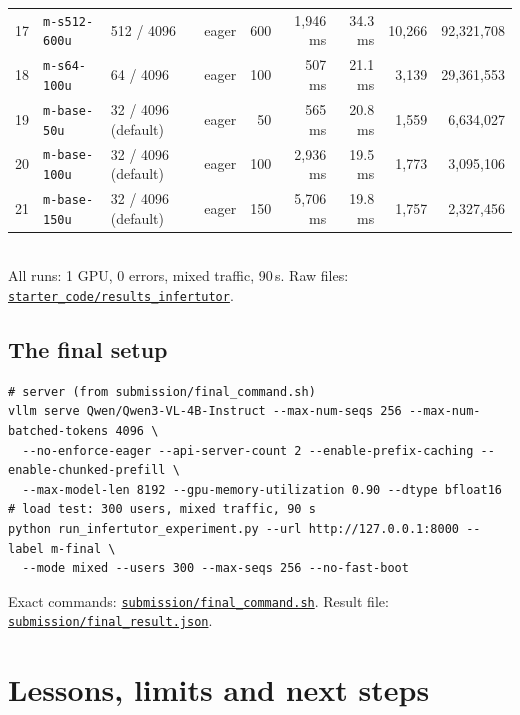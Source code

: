 \documentclass[10pt,a4paper]{article}
\newcommand{\repo}{https://github.com/himanshu1573/qwen-vl-inference-arena}
\newcommand{\file}[1]{\href{\repo/blob/main/#1}{\nolinkurl{#1}}}
\begin{document}
\begin{center}
\begin{tabular}{@{}rlllrrrrr@{}}
17 & \texttt{m-s512-600u} & 512 / 4096 & eager & 600 & 1,946 ms & 34.3 ms & 10,266 & 92,321,708 \\
18 & \texttt{m-s64-100u} & 64 / 4096 & eager & 100 & 507 ms & 21.1 ms & 3,139 & 29,361,553 \\
19 & \texttt{m-base-50u} & 32 / 4096 (default) & eager & 50 & 565 ms & 20.8 ms & 1,559 & 6,634,027 \\
20 & \texttt{m-base-100u} & 32 / 4096 (default) & eager & 100 & 2,936 ms & 19.5 ms & 1,773 & 3,095,106 \\
21 & \texttt{m-base-150u} & 32 / 4096 (default) & eager & 150 & 5,706 ms & 19.8 ms & 1,757 & 2,327,456 \\
\bottomrule
\end{tabular}\\[2pt]
{\color{ink2}All runs: 1 GPU, 0 errors, mixed traffic, 90\,s. Raw files: \file{starter_code/results_infertutor}.}
\end{center}

\subsection{The final setup}
\begin{lstlisting}
# server (from submission/final_command.sh)
vllm serve Qwen/Qwen3-VL-4B-Instruct --max-num-seqs 256 --max-num-batched-tokens 4096 \
  --no-enforce-eager --api-server-count 2 --enable-prefix-caching --enable-chunked-prefill \
  --max-model-len 8192 --gpu-memory-utilization 0.90 --dtype bfloat16
# load test: 300 users, mixed traffic, 90 s
python run_infertutor_experiment.py --url http://127.0.0.1:8000 --label m-final \
  --mode mixed --users 300 --max-seqs 256 --no-fast-boot
\end{lstlisting}
Exact commands: \file{submission/final_command.sh}. Result file: \file{submission/final_result.json}.

\newpage
\section{Lessons, limits and next steps}
\end{document}
